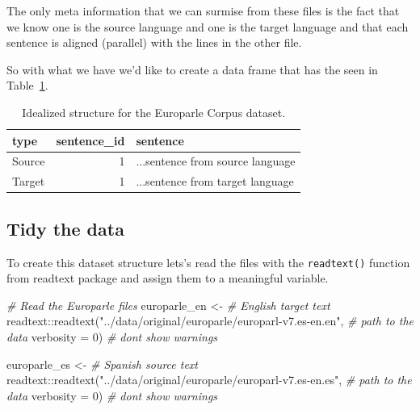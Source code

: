 \documentclass[
  letterpaper,
]{latex/krantz}
\newenvironment{Shaded}{\begin{snugshade}}{\end{snugshade}}
\newcommand{\AttributeTok}[1]{\textcolor[rgb]{0.00,0.00,0.00}{#1}}
\newcommand{\CommentTok}[1]{\textcolor[rgb]{0.00,0.00,0.00}{\textit{#1}}}
\newcommand{\DecValTok}[1]{\textcolor[rgb]{0.00,0.00,0.00}{#1}}
\newcommand{\FunctionTok}[1]{\textcolor[rgb]{0.00,0.00,0.00}{#1}}
\newcommand{\NormalTok}[1]{\textcolor[rgb]{0.00,0.00,0.00}{#1}}
\newcommand{\OtherTok}[1]{\textcolor[rgb]{0.00,0.00,0.00}{#1}}
\newcommand{\SpecialCharTok}[1]{\textcolor[rgb]{0.00,0.00,0.00}{#1}}
\newcommand{\StringTok}[1]{\textcolor[rgb]{0.00,0.00,0.00}{#1}}
\begin{document}
The only meta information that we can surmise from these files is the
fact that we know one is the source language and one is the target
language and that each sentence is aligned (parallel) with the lines in
the other file.

So with what we have we'd like to create a data frame that has the seen
in Table~\ref{tbl-cd-unstructured-europarle-structure-example}.

\hypertarget{tbl-cd-unstructured-europarle-structure-example}{}
\begin{table}
\caption{\label{tbl-cd-unstructured-europarle-structure-example}Idealized structure for the Europarle Corpus dataset. }\tabularnewline

\centering
\begin{tabular}{lrl}
\toprule
type & sentence\_id & sentence\\
\midrule
Source & 1 & ...sentence from source language\\
Target & 1 & ...sentence from target language\\
\bottomrule
\end{tabular}
\end{table}

\hypertarget{tidy-the-data}{%
\subsection{Tidy the data}\label{tidy-the-data}}

To create this dataset structure lets's read the files with the
\texttt{readtext()} function from readtext package and assign them to a
meaningful variable.

\begin{Shaded}
\begin{Highlighting}[]
\CommentTok{\# Read the Europarle files}
\NormalTok{europarle\_en }\OtherTok{\textless{}{-}}  \CommentTok{\# English target text}
\NormalTok{  readtext}\SpecialCharTok{::}\FunctionTok{readtext}\NormalTok{(}\StringTok{"../data/original/europarle/europarl{-}v7.es{-}en.en"}\NormalTok{, }\CommentTok{\# path to the data}
                     \AttributeTok{verbosity =} \DecValTok{0}\NormalTok{) }\CommentTok{\# don\textquotesingle{}t show warnings}

\NormalTok{europarle\_es }\OtherTok{\textless{}{-}} \CommentTok{\# Spanish source text}
\NormalTok{  readtext}\SpecialCharTok{::}\FunctionTok{readtext}\NormalTok{(}\StringTok{"../data/original/europarle/europarl{-}v7.es{-}en.es"}\NormalTok{, }\CommentTok{\# path to the data}
                     \AttributeTok{verbosity =} \DecValTok{0}\NormalTok{) }\CommentTok{\# don\textquotesingle{}t show warnings}
\end{Highlighting}
\end{Shaded}
\end{document}

